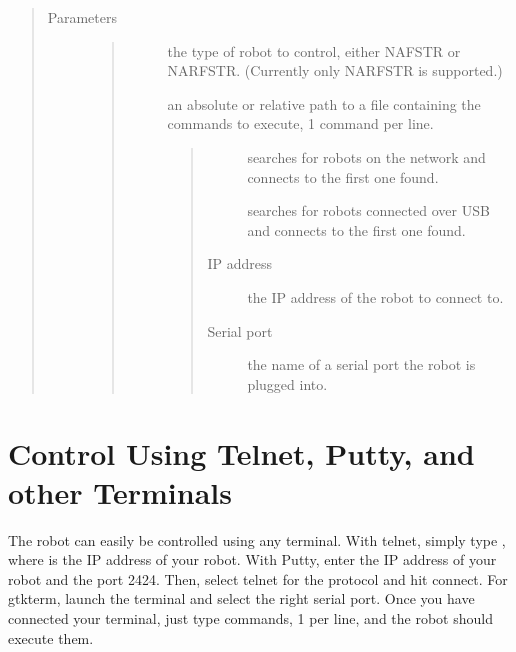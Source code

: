 \documentclass[letterpaper,10pt,english]{sphinxmanual}
\begin{document}
\begin{quote}\begin{description}
\item[{Parameters}] \leavevmode\begin{quote}\begin{description}
\item[{}] \leavevmode
the type of robot to control, either NAFSTR or NARFSTR. (Currently only NARFSTR is supported.)

\item[{}] \leavevmode
an absolute or relative path to a file containing the commands to execute, 1 command per line.

\item[{}] \leavevmode\begin{quote}\begin{description}
\item[{}] \leavevmode
searches for robots on the network and connects to the first one found.

\item[{}] \leavevmode
searches for robots connected over USB and connects to the first one found.

\item[{IP address}] \leavevmode
the IP address of the robot to connect to.

\item[{Serial port}] \leavevmode
the name of a serial port the robot is plugged into.

\end{description}\end{quote}

\end{description}\end{quote}

\end{description}\end{quote}


\section{Control Using Telnet, Putty, and other Terminals}
\label{Use:control-using-telnet-putty-and-other-terminals}
The robot can easily be controlled using any terminal. With telnet, simply type , where  is the IP address of your robot. With Putty, enter the IP address of your robot and the port 2424. Then, select telnet for the protocol and hit connect. For gtkterm, launch the terminal and select the right serial port. Once you have connected your terminal, just type commands, 1 per line, and the robot should execute them.



\renewcommand{\indexname}{Index}
\printindex
\end{document}
